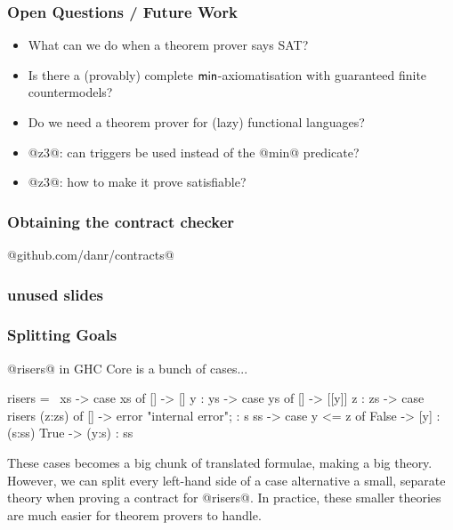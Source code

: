 \documentclass[serif,professionalfont]{beamer}
\begin{document}
\begin{frame}
  \frametitle{Open Questions / Future Work}

    \begin{itemize}

      \item What can we do when a theorem prover says SAT?

      \item Is there a (provably) complete $\mathsf{min}$-axiomatisation with
        guaranteed finite countermodels?

      \item Do we need a theorem prover for (lazy) functional languages?

      \item @z3@: can triggers be used instead of the @min@ predicate?

      \item @z3@: how to make it prove satisfiable?

    \end{itemize}

\end{frame}

\begin{frame}[fragile]
  \frametitle{Obtaining the contract checker}
    \begin{center}
      {\huge @github.com/danr/contracts@}
    \end{center}
\end{frame}

\begin{frame}[fragile]
  \frametitle{unused slides}

\end{frame}

\begin{frame}[fragile]
  \frametitle{Splitting Goals}
  @risers@ in GHC Core is a bunch of cases...

  \begin{code}
  risers = \ xs -> case xs of {
      [] -> []
      y : ys -> case ys of {
          [] -> [[y]]
          z : zs -> case risers (z:zs) of {
              [] -> error "internal error";
              : s ss -> case y <= z of {
                  False -> [y] : (s:ss)
                  True ->  (y:s) : ss
      } } } }
  \end{code}

  These cases becomes a big chunk of translated formulae, making a big
  theory. However, we can split every left-hand side of a case
  alternative a small, separate theory when proving a contract for
  @risers@. In practice, these smaller theories are much easier for
  theorem provers to handle.

\end{frame}
\end{document}
